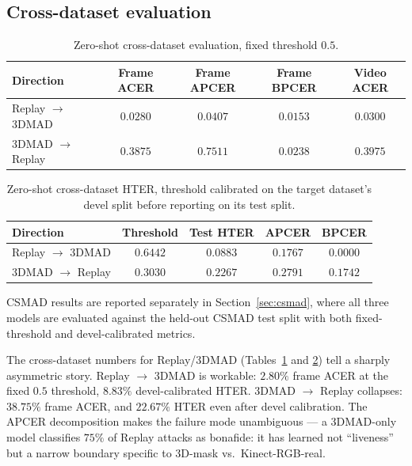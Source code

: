 \documentclass[anonymous, manuscript, screen, review]{acmart}
\begin{document}
\subsection{Cross-dataset evaluation}
\label{sec:cross-dataset}

\begin{table}[htbp]
\centering
\caption{Zero-shot cross-dataset evaluation, fixed threshold $0{.}5$.}
\label{tab:cross-fixed}
\small
\begin{tabular}{l c c c c}
\toprule
Direction & Frame ACER & Frame APCER & Frame BPCER & Video ACER \\
\midrule
Replay $\rightarrow$ 3DMAD & $0{.}0280$ & $0{.}0407$ & $0{.}0153$ & $0{.}0300$ \\
3DMAD  $\rightarrow$ Replay & $0{.}3875$ & $0{.}7511$ & $0{.}0238$ & $0{.}3975$ \\
\bottomrule
\end{tabular}
\end{table}

\begin{table}[htbp]
\centering
\caption{Zero-shot cross-dataset HTER, threshold calibrated on the
target dataset's devel split before reporting on its test split.}
\label{tab:cross-hter}
\small
\begin{tabular}{l c c c c}
\toprule
Direction & Threshold & Test HTER & APCER & BPCER \\
\midrule
Replay $\rightarrow$ 3DMAD & $0{.}6442$ & $0{.}0883$ & $0{.}1767$ & $0{.}0000$ \\
3DMAD  $\rightarrow$ Replay & $0{.}3030$ & $0{.}2267$ & $0{.}2791$ & $0{.}1742$ \\
\bottomrule
\end{tabular}
\end{table}

CSMAD results are reported separately in Section~\ref{sec:csmad},
where all three models are evaluated against the held-out CSMAD test
split with both fixed-threshold and devel-calibrated metrics.

The cross-dataset numbers for Replay/3DMAD
(Tables~\ref{tab:cross-fixed} and \ref{tab:cross-hter}) tell a sharply
asymmetric story. Replay $\rightarrow$ 3DMAD is workable: $2{.}80\%$
frame ACER at the fixed $0{.}5$ threshold, $8{.}83\%$ devel-calibrated
HTER. 3DMAD $\rightarrow$ Replay collapses: $38{.}75\%$ frame ACER, and
$22{.}67\%$ HTER even after devel calibration. The APCER decomposition
makes the failure mode unambiguous --- a 3DMAD-only model classifies
$75\%$ of Replay attacks as bonafide: it has learned not ``liveness''
but a narrow boundary specific to 3D-mask vs.\ Kinect-RGB-real.
\end{document}
